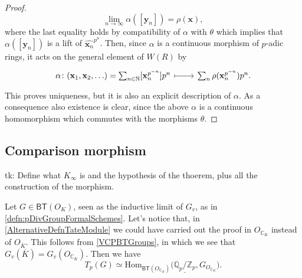 \begin{proof}
\begin{equation*}
		\lim_{n \to \infty} \alpha([\mathbf{y}_n]) = \rho(\mathbf{x})
	,\end{equation*}
	where the last equality holds by compatibility of $\alpha$ with $\theta$
	which implies that $\alpha([\mathbf{y}_n])$ is a lift of $\widehat{\mathbf{x}_n}^{p^n}$.
	Then, since $\alpha$ is a continuous morphism of $p$-adic rings,
	it acts on the general element of $W(R)$ by
	\begin{equation*}
	\begin{tikzcd}[row sep = 0ex
		,/tikz/column 1/.append style={anchor=base east}
		,/tikz/column 2/.append style={anchor=base west}]
		\alpha\colon 
		(\mathbf{x}_1, \mathbf{x}_2, \ldots) =
		\sum_{n \in \mathbb{N} }^{  } [\mathbf{x}_n^{p^{-n}}] p^n
		\arrow[r, "", mapsto] &
		\sum_{n }^{  } \rho (\mathbf{x}_n^{p^{-n}}) p^n
	.\end{tikzcd}
	\end{equation*} 
	This proves uniqueness, but it is also an explicit description of $\alpha$.
	As a consequence also existence is clear, since the above $\alpha$ is
	a continuous homomorphism which commutes with the morphisms $\theta$.
\end{proof}



\subsection{Comparison morphism}
tk: Define what $K_{\infty}$ is and the hypothesis of the thoerem, plus all the construction
of the morphism.


\begin{rem}[]\label{elementsTateModule}
	Let $G \in \mathsf{BT}(O_K)$, seen as the inductive limit of $G_v$, 
	as in \cref{defn:pDivGroupFormalSchemes}.
	Let's notice that, in \cref{AlternativeDefnTateModule} we could have
	carried out the proof in $O_{\mathbb{C}_K}$ instead of $O_{\overline{K}}$.
	This follows from \cref{VCPBTGroups}, in which we see that
	$G_v(\overline{K}) = G_v(O_{\mathbb{C}_K})$.
	Then we have
	\begin{equation*}
		T_p(G) \simeq \mathrm{Hom}_{\mathsf{BT}(O_{\mathbb{C}_K})} 
		\big( \underline{\mathbb{Q}_p/\mathbb{Z}_{p}}, G_{O_{\mathbb{C}_K}} \big)
	.\end{equation*}
\end{rem}


